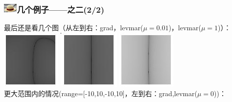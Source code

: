 \documentclass{beamer}
\begin{document}
\begin{frame}
\frametitle{\includegraphics[width=7mm,height=5mm]{Images/strawhat.jpg}几个例子——之二(2/2)}
\vspace{-1mm}
最后还是看几个图（从左到右：grad，levmar($\mu=0.01$)，levmar($\mu=1$)）：\\
\vspace{-1mm}
{\centering
\includegraphics[width=0.2\linewidth]{Images/fit_grad_small.jpg}
\includegraphics[width=0.21\linewidth]{Images/fit_levmar_0.01.jpg}
\includegraphics[width=0.205\linewidth]{Images/fit_levmar_1.jpg}\\
}
\vspace{-1mm}
更大范围内的情况(range=[-10,10,-10,10]，左到右：grad,levmar($\mu=0$))：\\
\vspace{-1mm}
\begin{center}
\end{center}
\end{frame}
\end{document}
